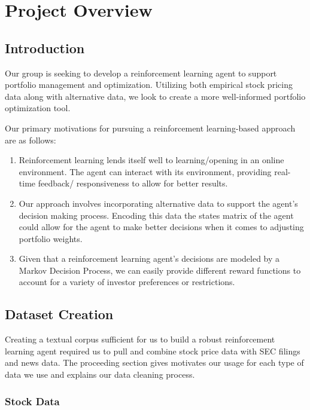 \chapter{Project Overview}

\section{Introduction}

Our group is seeking to develop a reinforcement learning agent to support portfolio 
management and optimization. Utilizing both empirical stock pricing data along with 
alternative data, we look to create a more well-informed portfolio optimization tool. 

Our primary motivations for pursuing a reinforcement learning-based approach are as 
follows:

\begin{enumerate}
    \item Reinforcement learning lends itself well to learning/opening in an online environment. The agent can interact with its environment, providing real-time feedback/ responsiveness to allow for better results.
    \item Our approach involves incorporating alternative data to support the agent’s decision making process. Encoding this data the states matrix of the agent could allow for the agent to make better decisions when it comes to adjusting portfolio weights.
    \item Given that a reinforcement learning agent’s decisions are modeled by a Markov Decision Process, we can easily provide different reward functions to account for a variety of investor preferences or restrictions.
\end{enumerate}



\section{Dataset Creation}

Creating a textual corpus sufficient for us to build 
a robust reinforcement learning agent required us to pull and combine stock price data with SEC filings and news data. 
The proceeding section gives motivates our usage for each type of data we use and explains our data cleaning process.

\subsection{Stock Data}

